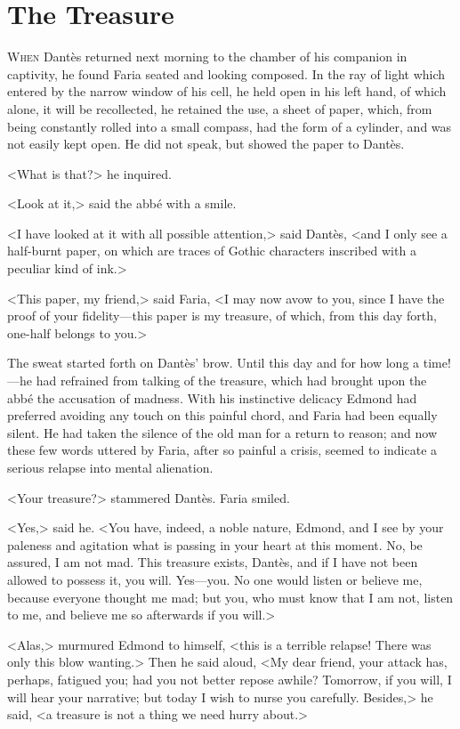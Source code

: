 \chapter{The Treasure} 

 \lettrine{W}{hen} Dantès returned next morning to the chamber of his companion in captivity, he found Faria seated and looking composed. In the ray of light which entered by the narrow window of his cell, he held open in his left hand, of which alone, it will be recollected, he retained the use, a sheet of paper, which, from being constantly rolled into a small compass, had the form of a cylinder, and was not easily kept open. He did not speak, but showed the paper to Dantès. 

 <What is that?> he inquired. 

 <Look at it,> said the abbé with a smile. 

 <I have looked at it with all possible attention,> said Dantès, <and I only see a half-burnt paper, on which are traces of Gothic characters inscribed with a peculiar kind of ink.> 

 <This paper, my friend,> said Faria, <I may now avow to you, since I have the proof of your fidelity—this paper is my treasure, of which, from this day forth, one-half belongs to you.> 

 The sweat started forth on Dantès' brow. Until this day and for how long a time!—he had refrained from talking of the treasure, which had brought upon the abbé the accusation of madness. With his instinctive delicacy Edmond had preferred avoiding any touch on this painful chord, and Faria had been equally silent. He had taken the silence of the old man for a return to reason; and now these few words uttered by Faria, after so painful a crisis, seemed to indicate a serious relapse into mental alienation. 

 <Your treasure?> stammered Dantès. Faria smiled. 

 <Yes,> said he. <You have, indeed, a noble nature, Edmond, and I see by your paleness and agitation what is passing in your heart at this moment. No, be assured, I am not mad. This treasure exists, Dantès, and if I have not been allowed to possess it, you will. Yes—you. No one would listen or believe me, because everyone thought me mad; but you, who must know that I am not, listen to me, and believe me so afterwards if you will.> 

 <Alas,> murmured Edmond to himself, <this is a terrible relapse! There was only this blow wanting.> Then he said aloud, <My dear friend, your attack has, perhaps, fatigued you; had you not better repose awhile? Tomorrow, if you will, I will hear your narrative; but today I wish to nurse you carefully. Besides,> he said, <a treasure is not a thing we need hurry about.> 

